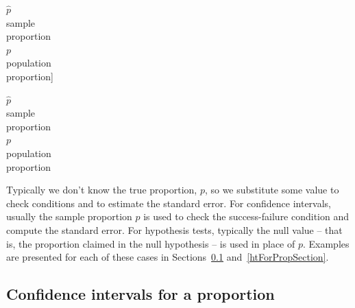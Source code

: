$\hat{p}$\vspace{0mm}\\\footnotesize sample\\proportion\vspace{3mm}\\\normalsize$p$\vspace{0mm}\\\footnotesize population\\proportion]{\raggedright\vspace{-53mm}

$\hat{p}$\vspace{0mm}\\\footnotesize sample\\proportion\vspace{3mm}\\\normalsize$p$\vspace{0mm}\\\footnotesize population\\proportion}

Typically we don't know the true proportion, $p$, so we substitute some value to check conditions and to estimate the standard error. For confidence intervals, usually the sample proportion $\hat{p}$ is used to check the success-failure condition and compute the standard error. For hypothesis tests, typically the null value -- that is, the proportion claimed in the null hypothesis -- is used in place of $p$. Examples are presented for each of these cases in Sections~\ref{confIntForPropSection} and~\ref{htForPropSection}.





\subsection{Confidence intervals for a proportion}
\label{confIntForPropSection}


